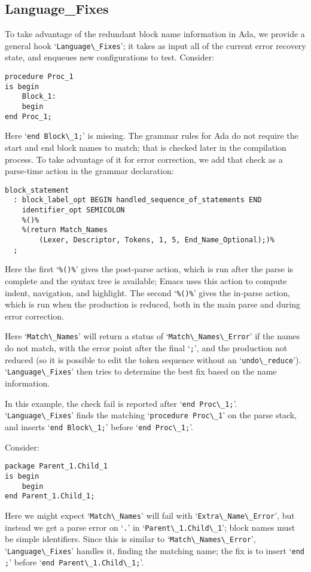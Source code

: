 \documentclass{article}
\newcommand{\code}[1]{`\lstinline|#1|'}
\begin{document}
\subsection{Language\_Fixes}
To take advantage of the redundant block name information in Ada, we
provide a general hook \code{Language\_Fixes}; it takes as input all of
the current error recovery state, and enqueues new configurations to
test.
Consider:
\begin{lstlisting}
procedure Proc_1
is begin
    Block_1:
    begin
end Proc_1;
\end{lstlisting}
Here \code{end Block\_1;} is missing. The grammar rules for Ada do not
require the start and end block names to match; that is checked later
in the compilation process. To take advantage of it for error
correction, we add that check as a parse-time action in the grammar
declaration:
\begin{verbatim}
block_statement
  : block_label_opt BEGIN handled_sequence_of_statements END
    identifier_opt SEMICOLON
    %()%
    %(return Match_Names
        (Lexer, Descriptor, Tokens, 1, 5, End_Name_Optional);)%
  ;
\end{verbatim}
Here the first `\verb|%()%|' gives the post-parse action, which is run
after the parse is complete and the syntax tree is available; Emacs
uses this action to compute indent, navigation, and highlight. The
second `\verb|%()%|' gives the in-parse action, which is run when the
production is reduced, both in the main parse and during error
correction.

Here \code{Match\_Names} will return a status of
\code{Match\_Names\_Error} if the names do not match, with the error
point after the final \code{;}, and the production not reduced (so it
is possible to edit the token sequence without an
\code{undo\_reduce}). \code{Language\_Fixes} then tries to determine
the best fix based on the name information.

In this example, the check fail is reported after \code{end Proc\_1;}.
\code{Language\_Fixes} finds the matching \code{procedure Proc\_1} on
the parse stack, and inserts \code{end Block\_1;} before
\code{end Proc\_1;}.

Consider:
\begin{lstlisting}
package Parent_1.Child_1
is begin
    begin
end Parent_1.Child_1;
\end{lstlisting}
Here we might expect \code{Match\_Names} will fail with
\code{Extra\_Name\_Error}, but instead we get a parse error on \code{.}
in \code{Parent\_1.Child\_1}; block names must be simple identifiers.
Since this is similar to \code{Match\_Names\_Error},
\code{Language\_Fixes} handles it, finding the matching name; the
fix is to insert \code{end ;} before \code{end Parent\_1.Child\_1;}.
\end{document}
